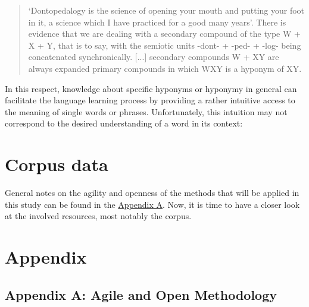 \documentclass[jou]{apa6} %
\begin{document}
\blockquote[{\cite[p.~43]{souille-rigautSemanticAccountQuasiLexemes2010}}]{‘Dontopedalogy is the science of opening your mouth and putting your foot in it, a science which I have practiced for a good many years’. There is evidence that we are dealing with a secondary compound of the type W + X + Y, that is to say, with the semiotic units -dont- + -ped- + -log- being concatenated synchronically. [...] secondary compounds W + XY are always expanded primary compounds in which WXY is a hyponym of XY.}
In this respect, knowledge about specific hyponyms or hyponymy in general can facilitate the language learning process by providing a rather intuitive access to the meaning of single words or phrases. Unfortunately, this intuition may not correspond to the desired understanding of a word in its context:
\section{Corpus data}

General notes on the agility and openness of the methods that will be applied in this study can be found in the \hyperref[sec:appendixA]{Appendix A}. Now, it is time to have a closer look at the involved resources, most notably the corpus. 

\section{Appendix}

\subsection{Appendix A: Agile and Open Methodology}
\label{sec:appendixA}
\end{document}
